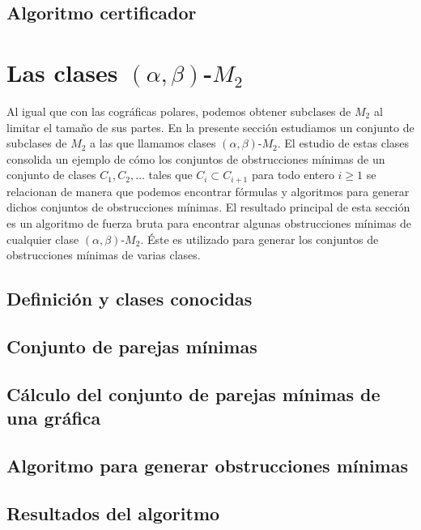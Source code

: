     \subsection{Algoritmo certificador}
        

\section{Las clases $(\alpha, \beta)$-$M_2$}

    Al igual que con las cográficas polares, podemos obtener subclases de $M_2$ al limitar el tamaño de sus partes. En la presente sección estudiamos un conjunto de subclases de $M_2$ a las que llamamos clases $(\alpha, \beta)$-$M_2$. El estudio de estas clases consolida un ejemplo de cómo los conjuntos de obstrucciones mínimas de un conjunto de clases $C_1,C_2, \dots$ tales que $C_i \subset C_{i+1}$ para todo entero $i \geq 1$ se relacionan de manera que podemos encontrar fórmulas y algoritmos para generar dichos conjuntos de obstrucciones mínimas. El resultado principal de esta sección es un algoritmo de fuerza bruta para encontrar algunas obstrucciones mínimas de cualquier clase $(\alpha, \beta)$-$M_2$. Éste es utilizado para generar los conjuntos de obstrucciones mínimas de varias clases. 
    
    \subsection{Definición y clases conocidas}
        

    \subsection{Conjunto de parejas mínimas}
        

    \subsection{Cálculo del conjunto de parejas mínimas de una gráfica}
        

    \subsection{Algoritmo para generar obstrucciones mínimas}
    
    \subsection{Resultados del algoritmo}

